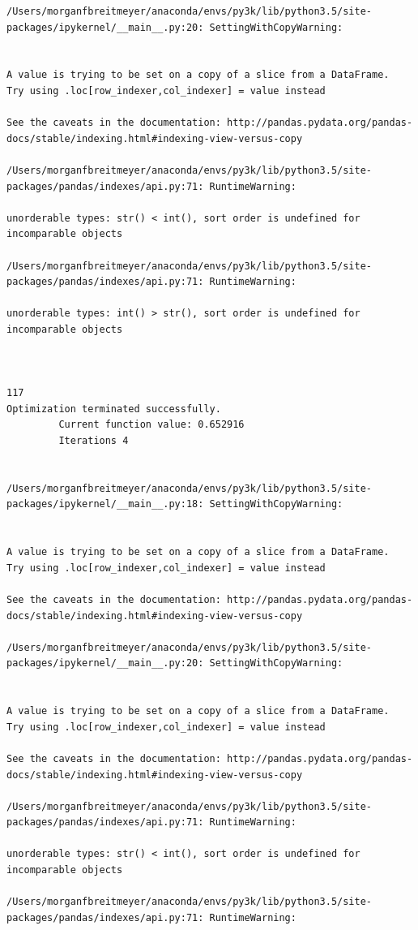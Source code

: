 \begin{lstlisting}
/Users/morganfbreitmeyer/anaconda/envs/py3k/lib/python3.5/site-packages/ipykernel/__main__.py:20: SettingWithCopyWarning:


A value is trying to be set on a copy of a slice from a DataFrame.
Try using .loc[row_indexer,col_indexer] = value instead

See the caveats in the documentation: http://pandas.pydata.org/pandas-docs/stable/indexing.html#indexing-view-versus-copy

/Users/morganfbreitmeyer/anaconda/envs/py3k/lib/python3.5/site-packages/pandas/indexes/api.py:71: RuntimeWarning:

unorderable types: str() < int(), sort order is undefined for incomparable objects

/Users/morganfbreitmeyer/anaconda/envs/py3k/lib/python3.5/site-packages/pandas/indexes/api.py:71: RuntimeWarning:

unorderable types: int() > str(), sort order is undefined for incomparable objects



117
Optimization terminated successfully.
         Current function value: 0.652916
         Iterations 4


/Users/morganfbreitmeyer/anaconda/envs/py3k/lib/python3.5/site-packages/ipykernel/__main__.py:18: SettingWithCopyWarning:


A value is trying to be set on a copy of a slice from a DataFrame.
Try using .loc[row_indexer,col_indexer] = value instead

See the caveats in the documentation: http://pandas.pydata.org/pandas-docs/stable/indexing.html#indexing-view-versus-copy

/Users/morganfbreitmeyer/anaconda/envs/py3k/lib/python3.5/site-packages/ipykernel/__main__.py:20: SettingWithCopyWarning:


A value is trying to be set on a copy of a slice from a DataFrame.
Try using .loc[row_indexer,col_indexer] = value instead

See the caveats in the documentation: http://pandas.pydata.org/pandas-docs/stable/indexing.html#indexing-view-versus-copy

/Users/morganfbreitmeyer/anaconda/envs/py3k/lib/python3.5/site-packages/pandas/indexes/api.py:71: RuntimeWarning:

unorderable types: str() < int(), sort order is undefined for incomparable objects

/Users/morganfbreitmeyer/anaconda/envs/py3k/lib/python3.5/site-packages/pandas/indexes/api.py:71: RuntimeWarning:


\end{lstlisting}
